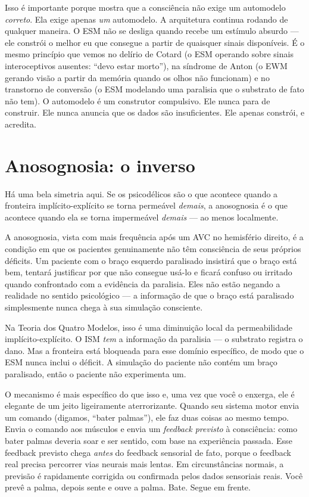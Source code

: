 \documentclass[11pt, twoside, openright]{book}
\begin{document}
Isso é importante porque mostra que a consciência não exige um automodelo \textit{correto}. Ela exige apenas \textit{um} automodelo. A arquitetura continua rodando de qualquer maneira. O ESM não se desliga quando recebe um estímulo absurdo --- ele constrói o melhor eu que consegue a partir de quaisquer sinais disponíveis. É o mesmo princípio que vemos no delírio de Cotard (o ESM operando sobre sinais interoceptivos ausentes: ``devo estar morto''), na síndrome de Anton (o EWM gerando visão a partir da memória quando os olhos não funcionam) e no transtorno de conversão (o ESM modelando uma paralisia que o substrato de fato não tem). O automodelo é um construtor compulsivo. Ele nunca para de construir. Ele nunca anuncia que os dados são insuficientes. Ele apenas constrói, e acredita.

\section*{Anosognosia: o inverso}

Há uma bela simetria aqui. Se os psicodélicos são o que acontece quando a fronteira implícito-explícito se torna permeável \textit{demais}, a anosognosia é o que acontece quando ela se torna impermeável \textit{demais} --- ao menos localmente.

A anosognosia, vista com mais frequência após um AVC no hemisfério direito, é a condição em que os pacientes genuinamente não têm consciência de seus próprios déficits. Um paciente com o braço esquerdo paralisado insistirá que o braço está bem, tentará justificar por que não consegue usá-lo e ficará confuso ou irritado quando confrontado com a evidência da paralisia. Eles não estão negando a realidade no sentido psicológico --- a informação de que o braço está paralisado simplesmente nunca chega à sua simulação consciente.

Na Teoria dos Quatro Modelos, isso é uma diminuição local da permeabilidade implícito-explícito. O ISM \textit{tem} a informação da paralisia --- o substrato registra o dano. Mas a fronteira está bloqueada para esse domínio específico, de modo que o ESM nunca inclui o déficit. A simulação do paciente não contém um braço paralisado, então o paciente não experimenta um.

O mecanismo é mais específico do que isso e, uma vez que você o enxerga, ele é elegante de um jeito ligeiramente aterrorizante. Quando seu sistema motor envia um comando (digamos, ``bater palmas''), ele faz duas coisas ao mesmo tempo. Envia o comando aos músculos e envia um \textit{feedback previsto} à consciência: como bater palmas deveria soar e ser sentido, com base na experiência passada. Esse feedback previsto chega \textit{antes} do feedback sensorial de fato, porque o feedback real precisa percorrer vias neurais mais lentas. Em circunstâncias normais, a previsão é rapidamente corrigida ou confirmada pelos dados sensoriais reais. Você prevê a palma, depois sente e ouve a palma. Bate. Segue em frente.
\end{document}
